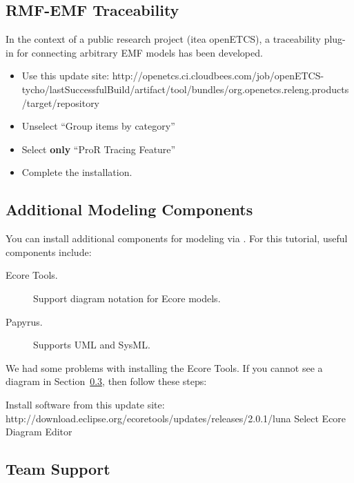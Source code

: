\subsection{RMF-EMF Traceability}

In the context of a public research project (itea openETCS), a traceability plug-in for connecting arbitrary EMF models has been developed.

\begin{itemize}
\item Use this update site: http://openetcs.ci.cloudbees.com/job/openETCS-tycho/lastSuccessfulBuild/artifact/tool/bundles/org.openetcs.releng.products/target/repository
\item Unselect ``Group items by category''
\item Select \textbf{only} ``ProR Tracing Feature''
\item Complete the installation.
\end{itemize}

\subsection{Additional Modeling Components}

You can install additional components for modeling via .  For this tutorial, useful components include:

\begin{description}
\item[Ecore Tools.] Support diagram notation for Ecore models.
\item[Papyrus.] Supports UML and SysML.
\end{description}

We had some problems with installing the Ecore Tools.  If you cannot see a diagram in Section~\ref{}, then follow these steps:

Install software from this update site: http://download.eclipse.org/ecoretools/updates/releases/2.0.1/luna
Select Ecore Diagram Editor

\subsection{Team Support}

